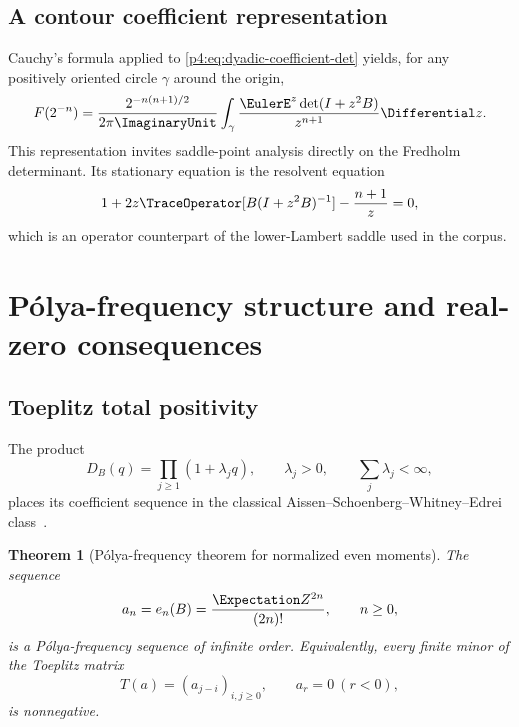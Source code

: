 \documentclass[11pt]{article}
\newtheorem{theorem}{Theorem}[section]
\theoremstyle{definition}
\theoremstyle{remark}
\begin{document}
\subsection{A contour coefficient representation}

Cauchy's formula applied to \eqref{p4:eq:dyadic-coefficient-det} yields, for any
positively oriented circle \(\gamma\) around the origin,
\begin{equation}
 F(2^{-n})=\frac{2^{-n(n+1)/2}}{2\pi\ImaginaryUnit}
 \int_{\gamma}\frac{\EulerE^z\det(I+z^2B)}{z^{n+1}}\Differential z.
 \label{p4:eq:dyadic-Cauchy}
\end{equation}
This representation invites saddle-point analysis directly on the Fredholm
determinant.  Its stationary equation is the resolvent equation
\begin{equation}
 1+2z\TraceOperator[B(I+z^2B)^{-1}]-\frac{n+1}{z}=0,
 \label{p4:eq:operator-saddle}
\end{equation}
which is an operator counterpart of the lower-Lambert saddle used in the corpus.

\section{P\'olya-frequency structure and real-zero consequences}
\label{p4:sec:PF}

\subsection{Toeplitz total positivity}

The product
\begin{equation}
 D_B(q)=\prod_{j\ge1}(1+\lambda_jq),
 \qquad \lambda_j>0,
 \qquad \sum_j\lambda_j<\infty,
 \label{p4:eq:DB-positive-product}
\end{equation}
places its coefficient sequence in the classical Aissen--Schoenberg--Whitney--Edrei
class~\cite{p4:ASW1952,p4:Edrei1952,p4:Schoenberg1951}.

\begin{theorem}[P\'olya-frequency theorem for normalized even moments]
\label{p4:thm:PF}
The sequence
\begin{equation}
 a_n=e_n(B)=\frac{\Expectation Z^{2n}}{(2n)!},\qquad n\ge0,
 \label{p4:eq:an-PF}
\end{equation}
is a P\'olya-frequency sequence of infinite order.  Equivalently, every finite minor
of the Toeplitz matrix
\begin{equation}
 T(a)=(a_{j-i})_{i,j\ge0},\qquad a_r=0\ (r<0),
 \label{p4:eq:Toeplitz-a}
\end{equation}
is nonnegative.
\end{theorem}
\end{document}

